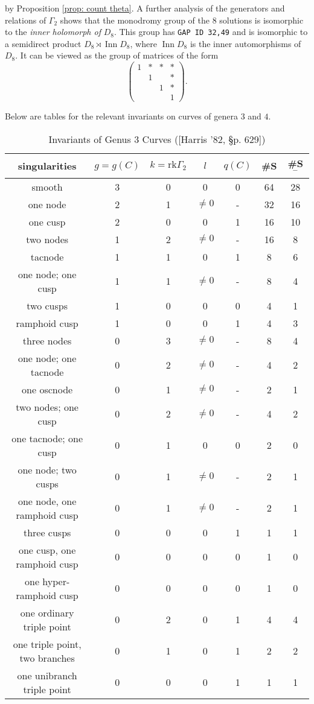 \documentclass[11pt,a4paper]{article}
\theoremstyle{mytheoremstyle}
\theoremstyle{mydefinitionstyle}
\newcommand{\HarrisThetaCite}[1]{[Harris '82, \S#1]}
\begin{document}
by Proposition \ref{prop: count theta}. A further analysis of the generators and relations of $\Gamma_2$ shows that the monodromy group of the $8$ solutions is isomorphic to the \textit{inner holomorph of }$D_8$. This group has \texttt{GAP ID 32,49} and is isomorphic to a semidirect product $D_8\rtimes \operatorname{Inn}D_8$, where $\operatorname{Inn}D_8$ is the inner automorphisms of $D_8$. It can be viewed as the group of matrices of the form $$ \begin{pmatrix}
1 & * & * & * \\
 & 1 &  & * \\
 &  & 1 & * \\
 &  &  & 1 
\end{pmatrix}. $$


Below are tables for the relevant invariants on curves of genera $3$ and $4$. 

\begin{table}[ht]
    \begin{tabular}{|c|c|c|c|c|c|c|}
        \hline singularities & $g=g(C)$ & $k=\mathrm{rk} \Gamma_2$ & $l$ & $q(C)$ & \#S & \#S ${ }^{-}$ \\
        \hline smooth & 3 & 0 & 0 & 0 & 64 & 28 \\
  one node & 2 & 1 & $\neq 0$ & - & 32 & 16 \\
  one cusp & 2 & 0 & 0 & 1 & 16 & 10 \\
  two nodes & 1 & 2 & $\neq 0$ & - & 16 & 8 \\
  tacnode & 1 & 1 & 0 & 1 & 8 & 6 \\
  one node; one cusp & 1 & 1 & $\neq 0$ & - & 8 & 4 \\
  two cusps & 1 & 0 & 0 & 0 & 4 & 1 \\
  ramphoid cusp & 1 & 0 & 0 & 1 & 4 & 3 \\
  three nodes & 0 & 3 & $\neq 0$ & - & 8 & 4 \\
  one node; one tacnode & 0 & 2 & $\neq 0$ & - & 4 & 2 \\
  one oscnode & 0 & 1 & $\neq 0$ & - & 2 & 1 \\
  two nodes; one cusp & 0 & 2 & $\neq 0$ & - & 4 & 2 \\
  one tacnode; one cusp & 0 & 1 & 0 & 0 & 2 & 0 \\
  one node; two cusps & 0 & 1 & $\neq 0$ & - & 2 & 1 \\
  one node, one ramphoid cusp & 0 & 1 & $\neq 0$ & - & 2 & 1 \\
  three cusps & 0 & 0 & 0 & 1 & 1 & 1 \\
  one cusp, one ramphoid cusp & 0 & 0 & 0 & 0 & 1 & 0 \\
  one hyper-ramphoid cusp & 0 & 0 & 0 & 0 & 1 & 0 \\
  one ordinary triple point & 0 & 2 & 0 & 1 & 4 & 4 \\
  one triple point, two branches & 0 & 1 & 0 & 1 & 2 & 2 \\
  one unibranch triple point & 0 & 0 & 0 & 1 & 1 & 1 \\
        \hline
        \end{tabular}
    \caption{Invariants of Genus $3$ Curves (\HarrisThetaCite{p. 629})}
\end{table}
\end{document}
